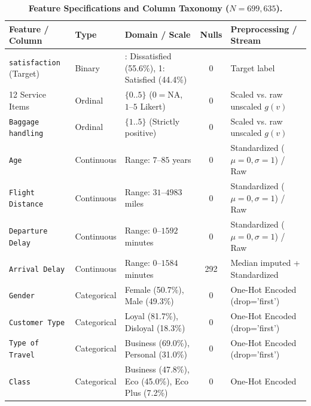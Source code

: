 \documentclass[10pt,a4paper]{article}
\renewcommand{\arraystretch}{0.85}
\begin{document}
\begin{table}[h]
\centering
\footnotesize
\renewcommand{\arraystretch}{0.82}
\setlength{\tabcolsep}{3.5pt}
\caption{\textbf{Feature Specifications and Column Taxonomy ($N=699{,}635$).}}
\label{tab:feature_specs}
\begin{tabularx}{\linewidth}{@{}l l >{\raggedright\arraybackslash}X c >{\raggedright\arraybackslash}X@{}}
\toprule
\textbf{Feature / Column} & \textbf{Type} & \textbf{Domain / Scale} & \textbf{Nulls} & \textbf{Preprocessing / Stream} \\
\midrule
\texttt{satisfaction} (Target) & Binary & 0: Dissatisfied (55.6\%), 1: Satisfied (44.4\%) & 0 & Target label \\
\midrule
12 Service Items\footnotemark & Ordinal & $\{0..5\}$ ($0 = \text{NA}$, $1\text{--}5$ Likert) & 0 & Scaled vs. raw unscaled $g(v)$ \\
\texttt{Baggage handling} & Ordinal & $\{1..5\}$ (Strictly positive) & 0 & Scaled vs. raw unscaled $g(v)$ \\
\midrule
\texttt{Age} & Continuous & Range: $7\text{--}85$ years & 0 & Standardized ($\mu=0,\sigma=1$) / Raw \\
\texttt{Flight Distance} & Continuous & Range: $31\text{--}4983$ miles & 0 & Standardized ($\mu=0,\sigma=1$) / Raw \\
\texttt{Departure Delay} & Continuous & Range: $0\text{--}1592$ minutes & 0 & Standardized ($\mu=0,\sigma=1$) / Raw \\
\texttt{Arrival Delay} & Continuous & Range: $0\text{--}1584$ minutes & 292 & Median imputed + Standardized \\
\midrule
\texttt{Gender} & Categorical & Female (50.7\%), Male (49.3\%) & 0 & One-Hot Encoded (drop='first') \\
\texttt{Customer Type} & Categorical & Loyal (81.7\%), Disloyal (18.3\%) & 0 & One-Hot Encoded (drop='first') \\
\texttt{Type of Travel} & Categorical & Business (69.0\%), Personal (31.0\%) & 0 & One-Hot Encoded (drop='first') \\
\texttt{Class} & Categorical & Business (47.8\%), Eco (45.0\%), Eco Plus (7.2\%) & 0 & One-Hot Encoded \\
\bottomrule
\end{tabularx}
\end{table}
\end{document}
